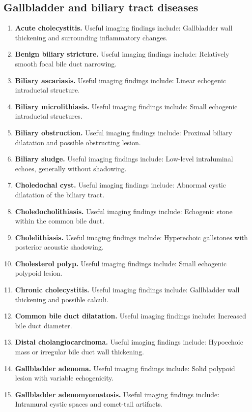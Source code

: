 \subsection{Gallbladder and biliary tract diseases}
\begin{enumerate}[leftmargin=*,itemsep=0.45em,topsep=0.4em]
\item \textbf{Acute cholecystitis.} Useful imaging findings include: Gallbladder wall thickening and surrounding inflammatory changes.
\item \textbf{Benign biliary stricture.} Useful imaging findings include: Relatively smooth focal bile duct narrowing.
\item \textbf{Biliary ascariasis.} Useful imaging findings include: Linear echogenic intraductal structure.
\item \textbf{Biliary microlithiasis.} Useful imaging findings include: Small echogenic intraductal structures.
\item \textbf{Biliary obstruction.} Useful imaging findings include: Proximal biliary dilatation and possible obstructing lesion.
\item \textbf{Biliary sludge.} Useful imaging findings include: Low-level intraluminal echoes, generally without shadowing.
\item \textbf{Choledochal cyst.} Useful imaging findings include: Abnormal cystic dilatation of the biliary tract.
\item \textbf{Choledocholithiasis.} Useful imaging findings include: Echogenic stone within the common bile duct.
\item \textbf{Cholelithiasis.} Useful imaging findings include: Hyperechoic gallstones with posterior acoustic shadowing.
\item \textbf{Cholesterol polyp.} Useful imaging findings include: Small echogenic polypoid lesion.
\item \textbf{Chronic cholecystitis.} Useful imaging findings include: Gallbladder wall thickening and possible calculi.
\item \textbf{Common bile duct dilatation.} Useful imaging findings include: Increased bile duct diameter.
\item \textbf{Distal cholangiocarcinoma.} Useful imaging findings include: Hypoechoic mass or irregular bile duct wall thickening.
\item \textbf{Gallbladder adenoma.} Useful imaging findings include: Solid polypoid lesion with variable echogenicity.
\item \textbf{Gallbladder adenomyomatosis.} Useful imaging findings include: Intramural cystic spaces and comet-tail artifacts.

\end{enumerate}
